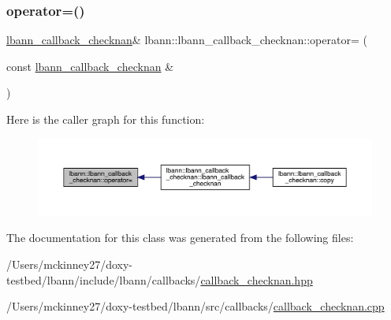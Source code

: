 \mbox{\label{classlbann_1_1lbann__callback__checknan_a93b6c22d9fa21a77b91572b6e1c7c3d1}} 
\subsubsection{\texorpdfstring{operator=()}{operator=()}}
{\footnotesize\ttfamily \hyperlink{classlbann_1_1lbann__callback__checknan}{lbann\+\_\+callback\+\_\+checknan}\& lbann\+::lbann\+\_\+callback\+\_\+checknan\+::operator= (\begin{DoxyParamCaption}\item[{const \hyperlink{classlbann_1_1lbann__callback__checknan}{lbann\+\_\+callback\+\_\+checknan} \&}]{ }\end{DoxyParamCaption})\hspace{0.3cm}{\ttfamily [default]}}

Here is the caller graph for this function\+:\nopagebreak
\begin{figure}[H]
\begin{center}
\leavevmode
\includegraphics[width=350pt]{classlbann_1_1lbann__callback__checknan_a93b6c22d9fa21a77b91572b6e1c7c3d1_icgraph}
\end{center}
\end{figure}


The documentation for this class was generated from the following files\+:\begin{DoxyCompactItemize}
\item 
/\+Users/mckinney27/doxy-\/testbed/lbann/include/lbann/callbacks/\hyperlink{callback__checknan_8hpp}{callback\+\_\+checknan.\+hpp}\item 
/\+Users/mckinney27/doxy-\/testbed/lbann/src/callbacks/\hyperlink{callback__checknan_8cpp}{callback\+\_\+checknan.\+cpp}\end{DoxyCompactItemize}

